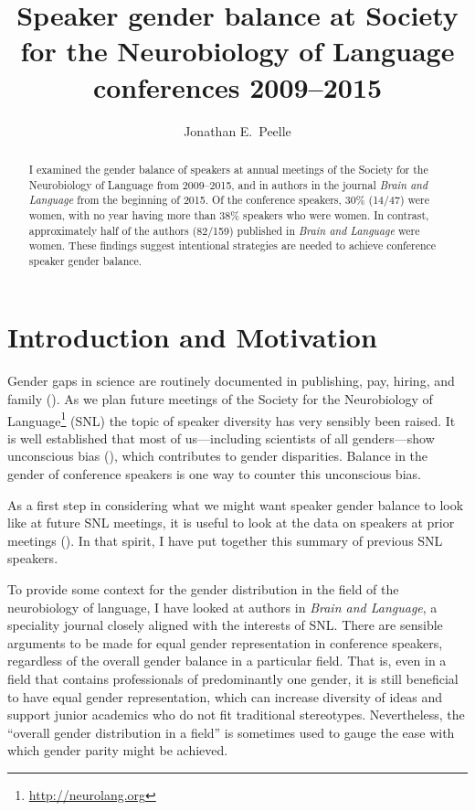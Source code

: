 \documentclass{winnower}
\begin{document}
\title{Speaker gender balance at Society for the Neurobiology of Language conferences 2009--2015}

\author{Jonathan E.\ Peelle}

\date{}

\maketitle

\begin{abstract}
I examined the gender balance of speakers at annual meetings of the Society for the Neurobiology of Language from 2009--2015, and in authors in the journal {\itshape Brain and Language} from the beginning of 2015. Of the conference speakers, 30\% (14/47) were women, with no year having more than 38\% speakers who were women. In contrast, approximately half of the authors (82/159) published in {\itshape Brain and Language} were women. These findings suggest intentional strategies are needed to achieve conference speaker gender balance.
\end{abstract}


\section{Introduction and Motivation}

Gender gaps in science are routinely documented in publishing, pay, hiring, and family (\cite{Shen2013}). As we plan future meetings of the Society for the Neurobiology of Language\footnote{\url{http://neurolang.org}} (SNL) the topic of speaker diversity has very sensibly been raised.  It is well established that most of us---including scientists of all genders---show unconscious bias (\cite{Raymond2013, Valian1999}), which contributes to gender disparities. Balance in the gender of conference speakers is one way to counter this unconscious bias.

As a first step in considering what we might want speaker gender balance to look like at future SNL meetings, it is useful to look at the data on speakers at prior meetings (\cite{Martin2014}). In that spirit, I have put together this summary of previous SNL speakers.

To provide some context for the gender distribution in the field of the neurobiology of language, I have looked at authors in {\itshape Brain and Language}, a speciality journal closely aligned with the interests of SNL. There are sensible arguments to be made for equal gender representation in conference speakers, regardless of the overall gender balance in a particular field. That is, even in a field that contains professionals of predominantly one gender, it is still beneficial to have equal gender representation, which can increase diversity of ideas and support junior academics who do not fit traditional stereotypes. Nevertheless, the ``overall gender distribution in a field'' is sometimes used to gauge the ease with which gender parity might be achieved.
\end{document}
